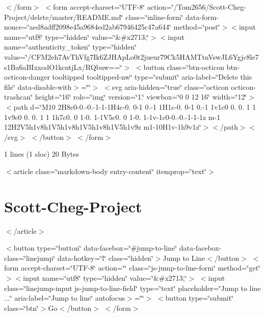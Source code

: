  $<$/form$>$ $<$form accept-\/charset=\char`\"{}\+U\+T\+F-\/8\char`\"{} action=\char`\"{}/\+Tom2656/\+Scott-\/\+Cheg-\/\+Project/delete/master/\+R\+E\+A\+D\+M\+E.\+md\char`\"{} class=\char`\"{}inline-\/form\char`\"{} data-\/form-\/nonce=\char`\"{}aed8adff2098e45a9684ed2ab67946425c47a644\char`\"{} method=\char`\"{}post\char`\"{}$>$$<$input name=\char`\"{}utf8\char`\"{} type=\char`\"{}hidden\char`\"{} value=\char`\"{}\&\#x2713;\char`\"{}$>$$<$input name=\char`\"{}authenticity\+\_\+token\char`\"{} type=\char`\"{}hidden\char`\"{} value=\char`\"{}/\+C\+F\+M2eh7\+Av\+Th\+Vfg7\+Ik6\+Z\+J\+H\+Ap\+Lo0t2jueur79\+Ck5\+H\+A\+M\+Ttn\+Vsw\+J\+L6\+Ygjc8le7s1\+Ba6a\+B\+Ixxod\+O1kcntj\+Lx/\+R\+Qbuw==\char`\"{}$>$ $<$button class=\char`\"{}btn-\/octicon btn-\/octicon-\/danger tooltipped tooltipped-\/nw\char`\"{} type=\char`\"{}submit\char`\"{} aria-\/label=\char`\"{}\+Delete this file\char`\"{} data-\/disable-\/with$>$=\char`\"{}\char`\"{}$>$ $<$svg aria-\/hidden=\char`\"{}true\char`\"{} class=\char`\"{}octicon octicon-\/trashcan\char`\"{} height=\char`\"{}16\char`\"{} role=\char`\"{}img\char`\"{} version=\char`\"{}1.\char`\"{} viewbox=\char`\"{}0 0 12 16\char`\"{} width=\char`\"{}12\char`\"{}$>$$<$path d=\char`\"{}\+M10 2\+H8c0-\/0.-\/0.-\/1-\/1-\/1\+H4c-\/0. 0-\/1 0.-\/1 1\+H1c-\/0. 0-\/1 0.-\/1 1v1c0 0. 0. 1 1 1v9c0 0. 0. 1 1 1h7c0. 0 1-\/0. 1-\/1\+V5c0. 0 1-\/0. 1-\/1v-\/1c0-\/0.-\/0.-\/1-\/1-\/1z m-\/1 12\+H2\+V5h1v8h1\+V5h1v8h1\+V5h1v8h1\+V5h1v9z m1-\/10\+H1v-\/1h9v1z\char`\"{}$>$$<$/path$>$$<$/svg$>$ $<$/button$>$ $<$/form$>$ 

  1 lines (1 sloc)  20 Bytes  

  $<$article class=\char`\"{}markdown-\/body entry-\/content\char`\"{} itemprop=\char`\"{}text\char`\"{}$>$\section*{\href{#scott-cheg-project}{\tt }Scott-\/\+Cheg-\/\+Project}

 $<$/article$>$ 



$<$button type=\char`\"{}button\char`\"{} data-\/facebox=\char`\"{}\#jump-\/to-\/line\char`\"{} data-\/facebox-\/class=\char`\"{}linejump\char`\"{} data-\/hotkey=\char`\"{}l\char`\"{} class=\char`\"{}hidden\char`\"{}$>$Jump to Line$<$/button$>$  $<$form accept-\/charset=\char`\"{}\+U\+T\+F-\/8\char`\"{} action=\char`\"{}\char`\"{} class=\char`\"{}js-\/jump-\/to-\/line-\/form\char`\"{} method=\char`\"{}get\char`\"{}$>$$<$input name=\char`\"{}utf8\char`\"{} type=\char`\"{}hidden\char`\"{} value=\char`\"{}\&\#x2713;\char`\"{}$>$ $<$input class=\char`\"{}linejump-\/input js-\/jump-\/to-\/line-\/field\char`\"{} type=\char`\"{}text\char`\"{} placeholder=\char`\"{}\+Jump to line{$\dots$}\char`\"{} aria-\/label=\char`\"{}\+Jump to line\char`\"{} autofocus$>$=\char`\"{}\char`\"{}$>$ $<$button type=\char`\"{}submit\char`\"{} class=\char`\"{}btn\char`\"{}$>$Go$<$/button$>$ $<$/form$>$

